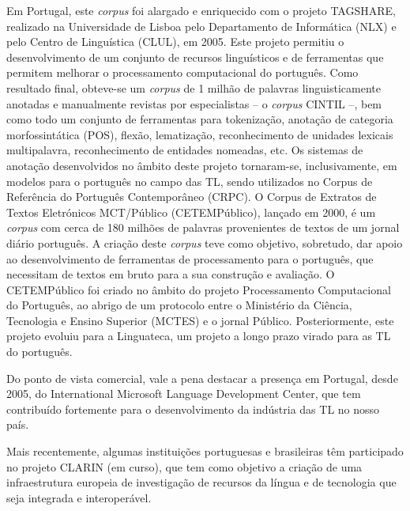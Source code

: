 \begin{multicols}{2}
Em Portugal, este \textit{corpus} foi alargado e enriquecido com o projeto TAGSHARE, realizado na Universidade de Lisboa pelo Departamento de Informática (NLX) e pelo Centro de Linguística (CLUL), em 2005. Este projeto permitiu o desenvolvimento de um conjunto de recursos linguísticos e de ferramentas que permitem melhorar o processamento computacional do português. Como resultado final, obteve-se um \textit{corpus} de 1 milhão de palavras linguisticamente anotadas e manualmente revistas por especialistas – o \textit{corpus} CINTIL\cite{cintil} –, bem como todo um conjunto de ferramentas para tokenização, anotação de categoria morfossintática (POS), flexão, lematização, reconhecimento de unidades lexicais multipalavra, reconhecimento de entidades nomeadas, etc. Os sistemas de anotação desenvolvidos no âmbito deste projeto tornaram-se, inclusivamente, em modelos para o português no campo das TL, sendo utilizados no Corpus de Referência do Português Contemporâneo (CRPC).
O Corpus de Extratos de Textos Eletrónicos MCT/Público (CETEMPúblico), lançado em 2000, é um \textit{corpus} com cerca de 180 milhões de palavras provenientes de textos de um jornal diário português. A criação deste \textit{corpus} teve como objetivo, sobretudo, dar apoio ao desenvolvimento de ferramentas de processamento para o português, que necessitam de textos em bruto para a sua construção e avaliação. O CETEMPúblico foi criado no âmbito do projeto Processamento Computacional do Português, ao abrigo de um protocolo entre o Ministério da Ciência, Tecnologia e Ensino Superior (MCTES) e o jornal Público. Posteriormente, este projeto evoluiu para a Linguateca\cite{linguateca}, um projeto a longo prazo virado para as TL do português.

Do ponto de vista comercial, vale a pena destacar a presença em Portugal, desde 2005, do International Microsoft Language Development Center, que tem contribuído fortemente para o desenvolvimento da indústria das TL no nosso país.

Mais recentemente, algumas instituições portuguesas e brasileiras têm participado no projeto CLARIN (em curso), que tem como objetivo a criação de uma infraestrutura europeia de investigação de recursos da língua e de tecnologia que seja integrada e interoperável.


\end{multicols}

